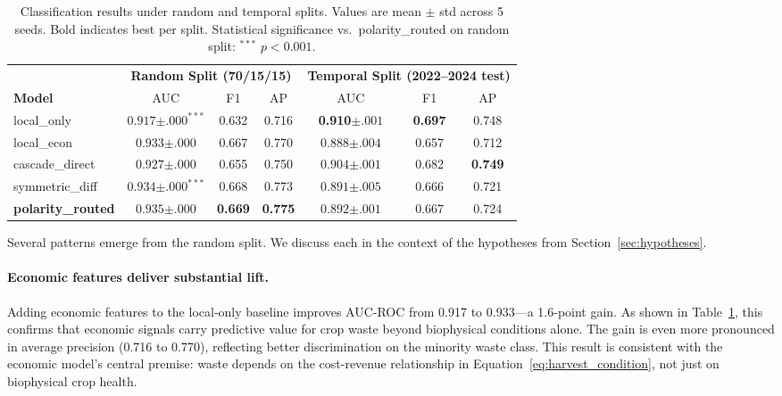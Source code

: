 \documentclass[preprint,12pt,authoryear]{elsarticle}
\begin{document}
\begin{table}[t]
\centering
\caption{Classification results under random and temporal splits. Values are mean $\pm$ std across 5 seeds. Bold indicates best per split. Statistical significance vs.\ polarity\_routed on random split: $^{***}$ $p < 0.001$.}
\label{tab:main_results}
\begin{tabular}{@{}l ccc ccc@{}}
\toprule
& \multicolumn{3}{c}{\textbf{Random Split (70/15/15)}} & \multicolumn{3}{c}{\textbf{Temporal Split (2022--2024 test)}} \\
\cmidrule(lr){2-4} \cmidrule(lr){5-7}
\textbf{Model} & AUC & F1 & AP & AUC & F1 & AP \\
\midrule
local\_only        & $0.917{\scriptstyle\pm.000}^{***}$ & 0.632 & 0.716 & \textbf{0.910}${\scriptstyle\pm.001}$ & \textbf{0.697} & 0.748 \\
local\_econ        & $0.933{\scriptstyle\pm.000}$        & 0.667 & 0.770 & $0.888{\scriptstyle\pm.004}$        & 0.657 & 0.712 \\
cascade\_direct    & $0.927{\scriptstyle\pm.000}$        & 0.655 & 0.750 & $0.904{\scriptstyle\pm.001}$        & 0.682 & \textbf{0.749} \\
symmetric\_diff    & $0.934{\scriptstyle\pm.000}^{***}$  & 0.668 & 0.773 & $0.891{\scriptstyle\pm.005}$        & 0.666 & 0.721 \\
\textbf{polarity\_routed} & $\mathbf{0.935}{\scriptstyle\pm.000}$ & \textbf{0.669} & \textbf{0.775} & $0.892{\scriptstyle\pm.001}$ & 0.667 & 0.724 \\
\bottomrule
\end{tabular}
\end{table}

Several patterns emerge from the random split. We discuss each in the context of the hypotheses from Section~\ref{sec:hypotheses}.

\paragraph{Economic features deliver substantial lift.} Adding economic features to the local-only baseline improves AUC-ROC from 0.917 to 0.933---a 1.6-point gain. As shown in Table~\ref{tab:main_results}, this confirms that economic signals carry predictive value for crop waste beyond biophysical conditions alone. The gain is even more pronounced in average precision (0.716 to 0.770), reflecting better discrimination on the minority waste class. This result is consistent with the economic model's central premise: waste depends on the cost-revenue relationship in Equation~\eqref{eq:harvest_condition}, not just on biophysical crop health.
\end{document}
